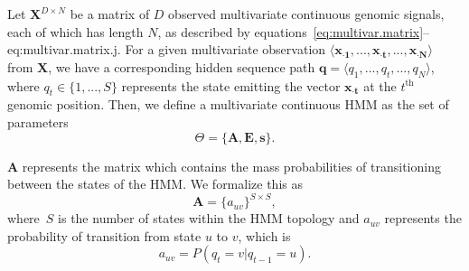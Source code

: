 Let $\mathbf{X}^{D \times N}$ be a matrix of $D$ observed multivariate continuous genomic signals, each of which has length $N$, as described by equations~\ref{eq:multivar.matrix}--{eq:multivar.matrix.j}. For a given multivariate observation $\langle \mathbf{{x}_{\cdot 1}}, ..., \mathbf{{x}_{\cdot t}}, ..., \mathbf{{x}_{\cdot N}} \rangle$ from $\mathbf{X}$, we have a corresponding hidden sequence path $\mathbf{q} = \langle q_1, ..., q_t, ..., q_N \rangle$, where $ q_t \in \{1, ..., S\} $ represents the state emitting the vector $ \mathbf{{x}_{\cdot t}} $ at the $t^{\text{th}}$ genomic position. Then, we define a multivariate continuous HMM as the set of parameters
\begin{equation}
  \label{eq:hmm.theta}
  \Theta= \{\mathbf{A}, \mathbf{E}, \mathbf{s}\}.
\end{equation}

$\mathbf{A}$ represents the matrix which contains the mass probabilities of transitioning between the states of the HMM. We formalize this as
\begin{equation}
  \label{eq:hmm.a}
  \mathbf{A} = {\{a_{uv}\}}^{S \times S},
\end{equation}
where~$S$ is the number of states within the HMM topology and $a_{uv}$ represents the probability of transition from state $u$ to $v$, which is
\begin{equation}
  \label{eq:hmm.transition}
  a_{uv} = P(q_t = v | q_{t-1} = u).
\end{equation}


